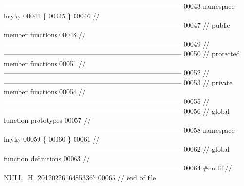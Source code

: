 \begin{DoxyCode}
{      ------------------------------------------------------------------------------}
00043 \textcolor{keyword}{namespace }hryky
00044 \{
00045 \}
00046 \textcolor{comment}{//
      ------------------------------------------------------------------------------}
00047 \textcolor{comment}{// public member functions}
00048 \textcolor{comment}{//
      ------------------------------------------------------------------------------}
00049 \textcolor{comment}{//
      ------------------------------------------------------------------------------}
00050 \textcolor{comment}{// protected member functions}
00051 \textcolor{comment}{//
      ------------------------------------------------------------------------------}
00052 \textcolor{comment}{//
      ------------------------------------------------------------------------------}
00053 \textcolor{comment}{// private member functions}
00054 \textcolor{comment}{//
      ------------------------------------------------------------------------------}
00055 \textcolor{comment}{//
      ------------------------------------------------------------------------------}
00056 \textcolor{comment}{// global function prototypes}
00057 \textcolor{comment}{//
      ------------------------------------------------------------------------------}
00058 \textcolor{keyword}{namespace }hryky
00059 \{
00060 \}
00061 \textcolor{comment}{//
      ------------------------------------------------------------------------------}
00062 \textcolor{comment}{// global function definitions}
00063 \textcolor{comment}{//
      ------------------------------------------------------------------------------}
00064 \textcolor{preprocessor}{#endif // NULL\_H\_20120226164853367}
00065 \textcolor{preprocessor}{}\textcolor{comment}{// end of file}
\end{DoxyCode}
